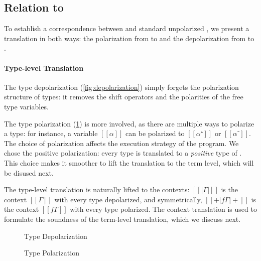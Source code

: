 \subsection{Relation to \systemf}
\label{sec:rel-to-systemf}

To establish a correspondence between \fexists and standard unpolarized \systemf,
we present a translation in both ways: the polarization from \systemf to \fexists
and the depolarization from \fexists to \systemf.



\paragraph{Type-level Translation}

The type depolarization (\cref{fig:depolarization}) simply forgets the polarization structure of types:
it removes the shift operators and the polarities of the free type variables.

The type polarization (\cref{fig:polarization}) is more involved, as there are multiple
ways to polarize a type: for instance, a variable $[[α]]$ can be polarized to $[[α⁺]]$ or $[[α⁻]]$.
The choice of polarization affects the execution strategy of the program.
We chose the positive polarization: every \systemf type is translated to a \emph{positive} type of \fexists.
This choice makes it smoother to lift the translation to the term level, which will be disused next.

The type-level translation is naturally lifted to the contexts:
$[[|Γ|]]$ is the context $[[Γ]]$ with every type depolarized,
and symmetrically, $[[+|fΓ|+]]$ is the context $[[fΓ]]$ with every type polarized.
The context translation is used to formulate the soundness of the
 term-level translation, which we discuss next.


\begin{figure}[ht]
  \begin{minipage}[t]{0.65\linewidth}
    \centering
      \begin{minipage}[t]{0.32\linewidth}
      \ottfundefnunpolP{}
      \end{minipage}
      \begin{minipage}[t]{0.32\linewidth}
      \ottfundefnunpolN{}
      \end{minipage}
    \caption{Type Depolarization \protect\footnotemark}
    \label{fig:depolarization}
  \end{minipage}
  \hspace{0.5cm}
  \begin{minipage}[t]{0.3\linewidth}
    \centering
    \ottfundefnpolarP{}
    \caption{Type Polarization}
    \label{fig:polarization}
  \end{minipage}

\end{figure}


